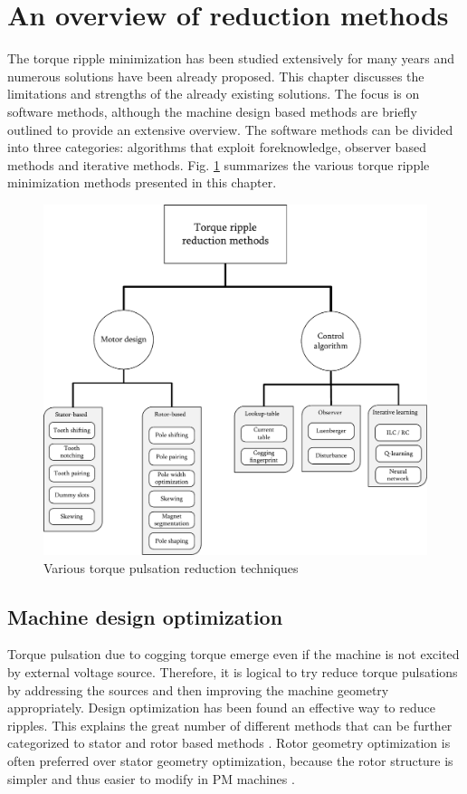 \section{An overview of reduction methods}

The torque ripple minimization has been studied extensively for many years and numerous solutions have been already proposed. This chapter discusses the limitations and strengths of the already existing solutions. The focus is on software methods, although the machine design based methods are briefly outlined to provide an extensive overview. The software methods can be divided into three categories: algorithms that exploit foreknowledge, observer based methods and iterative methods. Fig. \ref{minimization_methods} summarizes the various torque ripple minimization methods presented in this chapter.
\textbf{\textbf{}}\begin{figure}[ht] 
    \centering
    \includegraphics[width=1\linewidth]{images/minimization_methods.pdf} 
    \caption{Various torque pulsation reduction techniques}
    \label{minimization_methods} 
\end{figure}


\subsection{Machine design optimization}

Torque pulsation due to cogging torque emerge even if the machine is not excited by external voltage source. Therefore, it is logical to try reduce torque pulsations by addressing the sources and then improving the machine geometry appropriately. Design optimization has been found an effective way to reduce ripples. This explains the great number of different methods that can be further categorized to stator and rotor based methods \cite{CTR_HW:2013}. Rotor geometry optimization is often preferred over stator geometry optimization, because the rotor structure is simpler and thus easier to modify in PM machines \cite{TRR:1999, CTR_HW:2013}.

